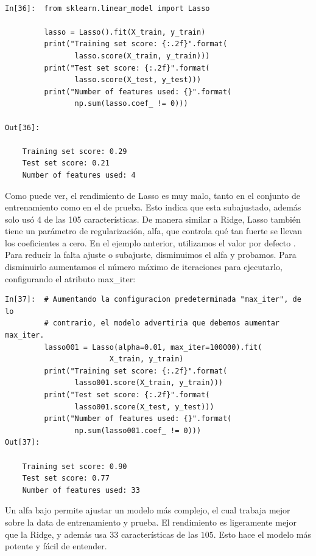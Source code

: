 {\begin{lstlisting}

In[36]:  from sklearn.linear_model import Lasso

         lasso = Lasso().fit(X_train, y_train)
         print("Training set score: {:.2f}".format(
                lasso.score(X_train, y_train)))
         print("Test set score: {:.2f}".format(
                lasso.score(X_test, y_test)))
         print("Number of features used: {}".format(
                np.sum(lasso.coef_ != 0)))

Out[36]:

    Training set score: 0.29
    Test set score: 0.21
    Number of features used: 4
\end{lstlisting}

Como puede ver, el rendimiento de Lasso es muy malo, tanto  en el conjunto de entrenamiento como en el de prueba. Esto indica que esta subajustado, además solo usó 4 de las 105 características.
De manera similar a Ridge, Lasso también tiene un parámetro de regularización, {\ttfamily alfa}, que controla
 qué tan fuerte se llevan los coeficientes a cero.  En el ejemplo anterior, utilizamos el valor por defecto  {}. Para reducir la falta ajuste o subajuste,  disminuimos el  {\ttfamily alfa}  y probamos. Para disminuirlo  aumentamos el número máximo de iteraciones para ejecutarlo, configurando  el atributo  {\ttfamily max\_iter}:\\


\begin{lstlisting}
In[37]:  # Aumentando la configuracion predeterminada "max_iter", de lo
         # contrario, el modelo advertiria que debemos aumentar max_iter.
         lasso001 = Lasso(alpha=0.01, max_iter=100000).fit(
                        X_train, y_train)
         print("Training set score: {:.2f}".format(
                lasso001.score(X_train, y_train)))
         print("Test set score: {:.2f}".format(
                lasso001.score(X_test, y_test)))
         print("Number of features used: {}".format(
                np.sum(lasso001.coef_ != 0)))
Out[37]:

    Training set score: 0.90
    Test set score: 0.77
    Number of features used: 33

\end{lstlisting}



Un {\ttfamily alfa} bajo permite ajustar un modelo más complejo, el cual trabaja mejor sobre la data de entrenamiento  y prueba. El rendimiento es ligeramente mejor que la Ridge, y además usa $ 33$ características de las $105$. Esto hace el modelo más potente y fácil de entender.\\

}
